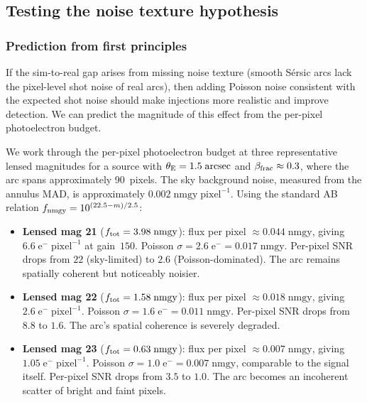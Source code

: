 \documentclass[fleqn,usenatbib]{mnras}
\begin{document}
\subsection{Testing the noise texture hypothesis}

\subsubsection{Prediction from first principles}
\label{sec:prediction}

If the sim-to-real gap arises from missing noise texture (smooth S\'{e}rsic arcs lack the pixel-level shot noise of real arcs), then adding Poisson noise consistent with the expected shot noise should make injections more realistic and improve detection.  We can predict the magnitude of this effect from the per-pixel photoelectron budget.

We work through the per-pixel photoelectron budget at three representative lensed magnitudes for a source with $\theta_{\rm E} = 1.5\;\mathrm{arcsec}$ and $\beta_{\rm frac} \approx 0.3$, where the arc spans approximately 90~pixels.  The sky background noise, measured from the annulus MAD, is approximately $0.002\;\mathrm{nmgy\;pixel^{-1}}$.  Using the standard AB relation $f_{\rm nmgy} = 10^{(22.5 - m)/2.5}$:

\begin{itemize}
\item \textbf{Lensed mag 21} ($f_{\rm tot} = 3.98\;\mathrm{nmgy}$): flux per pixel $\approx 0.044\;\mathrm{nmgy}$, giving $6.6\;\mathrm{e^{-}\;pixel^{-1}}$ at gain~$150$.  Poisson $\sigma = 2.6\;\mathrm{e^{-}} = 0.017\;\mathrm{nmgy}$.  Per-pixel SNR drops from $22$ (sky-limited) to $2.6$ (Poisson-dominated).  The arc remains spatially coherent but noticeably noisier.
\item \textbf{Lensed mag 22} ($f_{\rm tot} = 1.58\;\mathrm{nmgy}$): flux per pixel $\approx 0.018\;\mathrm{nmgy}$, giving $2.6\;\mathrm{e^{-}\;pixel^{-1}}$.  Poisson $\sigma = 1.6\;\mathrm{e^{-}} = 0.011\;\mathrm{nmgy}$.  Per-pixel SNR drops from $8.8$ to $1.6$.  The arc's spatial coherence is severely degraded.
\item \textbf{Lensed mag 23} ($f_{\rm tot} = 0.63\;\mathrm{nmgy}$): flux per pixel $\approx 0.007\;\mathrm{nmgy}$, giving $1.05\;\mathrm{e^{-}\;pixel^{-1}}$.  Poisson $\sigma = 1.0\;\mathrm{e^{-}} = 0.007\;\mathrm{nmgy}$, comparable to the signal itself.  Per-pixel SNR drops from $3.5$ to $1.0$.  The arc becomes an incoherent scatter of bright and faint pixels.
\end{itemize}
\end{document}
